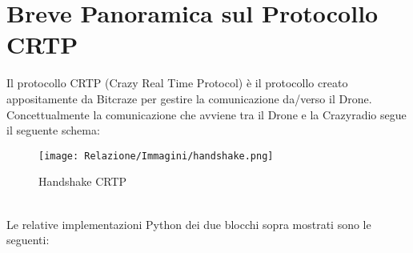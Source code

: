 \chapter*{Breve Panoramica sul Protocollo CRTP}

Il protocollo CRTP (Crazy Real Time Protocol) è il protocollo creato appositamente da Bitcraze per gestire la comunicazione da/verso il Drone. 
\\
Concettualmente la comunicazione che avviene tra il Drone e la Crazyradio segue il seguente schema: 
\begin{figure}[h]
    \centering
    \texttt{[image: Relazione/Immagini/handshake.png]}
    \caption{Handshake CRTP}
    \label{fig:Handshake}
\end{figure}
\\
Le relative implementazioni Python dei due blocchi sopra mostrati sono le seguenti: 

